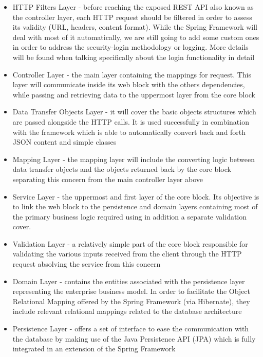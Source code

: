 \begin{itemize}
    \item HTTP Filters Layer - before reaching the exposed REST API also known as the controller layer, each HTTP request should be filtered in order to assess its validity (URL, headers, content format). While the Spring Framework will deal with most of it automatically, we are still going to add some custom ones in order to address the security-login methodology or logging. More details will be found when talking specifically about the login functionality in detail
    \item Controller Layer - the main layer containing the mappings for request. This layer will communicate inside its web block with the others dependencies, while passing and retrieving data to the uppermost layer from the core block
    \item Data Transfer Objects Layer - it will cover the basic objects structures which are passed alongside the HTTP calls. It is used successfully in combination with the framework which is able to automatically convert back and forth JSON content and simple classes
    \item Mapping Layer - the mapping layer will include the converting logic between data transfer objects and the objects returned back by the core block separating this concern from the main controller layer above
    \item Service Layer - the uppermost and first layer of the core block. Its objective is to link the web block to the persistence and domain layers containing most of the primary business logic required using in addition a separate validation cover.
    \item Validation Layer - a relatively simple part of the core block responsible for validating the various inputs received from the client through the HTTP request absolving the service from this concern
    \item Domain Layer - contains the entities associated with the persistence layer representing the enterprise business model. In order to facilitate the Object Relational Mapping offered by the Spring Framework (via Hibernate), they include relevant relational mappings related to the database architecture
    \item Persistence Layer - offers a set of interface to ease the communication with the database by making use of the Java Persistence API (JPA) which is fully integrated in an extension of the Spring Framework
\end{itemize}

